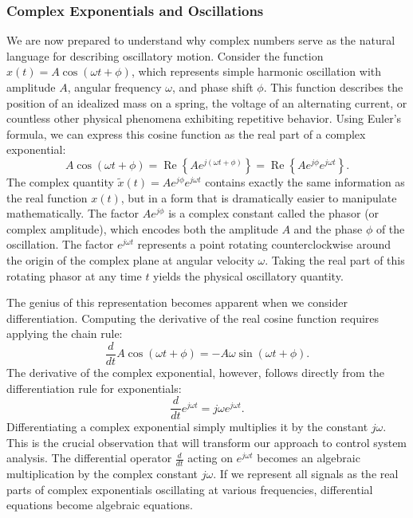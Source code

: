 \subsubsection{Complex Exponentials and Oscillations}

We are now prepared to understand why complex numbers serve as the natural language for describing oscillatory motion. Consider the function $x(t) = A\cos(\omega t + \phi)$, which represents simple harmonic oscillation with amplitude $A$, angular frequency $\omega$, and phase shift $\phi$. This function describes the position of an idealized mass on a spring, the voltage of an alternating current, or countless other physical phenomena exhibiting repetitive behavior. Using Euler's formula, we can express this cosine function as the real part of a complex exponential:
\begin{equation}
A\cos(\omega t + \phi) = \operatorname{Re}\left\{A e^{j(\omega t + \phi)}\right\} = \operatorname{Re}\left\{A e^{j\phi} e^{j\omega t}\right\}.
\end{equation}
The complex quantity $\tilde{x}(t) = A e^{j\phi} e^{j\omega t}$ contains exactly the same information as the real function $x(t)$, but in a form that is dramatically easier to manipulate mathematically. The factor $A e^{j\phi}$ is a complex constant called the phasor (or complex amplitude), which encodes both the amplitude $A$ and the phase $\phi$ of the oscillation. The factor $e^{j\omega t}$ represents a point rotating counterclockwise around the origin of the complex plane at angular velocity $\omega$. Taking the real part of this rotating phasor at any time $t$ yields the physical oscillatory quantity.

The genius of this representation becomes apparent when we consider differentiation. Computing the derivative of the real cosine function requires applying the chain rule:
\begin{equation}
\frac{d}{dt}A\cos(\omega t + \phi) = -A\omega\sin(\omega t + \phi).
\end{equation}
The derivative of the complex exponential, however, follows directly from the differentiation rule for exponentials:
\begin{equation}
\frac{d}{dt}e^{j\omega t} = j\omega e^{j\omega t}.
\end{equation}
Differentiating a complex exponential simply multiplies it by the constant $j\omega$. This is the crucial observation that will transform our approach to control system analysis. The differential operator $\frac{d}{dt}$ acting on $e^{j\omega t}$ becomes an algebraic multiplication by the complex constant $j\omega$. If we represent all signals as the real parts of complex exponentials oscillating at various frequencies, differential equations become algebraic equations.

